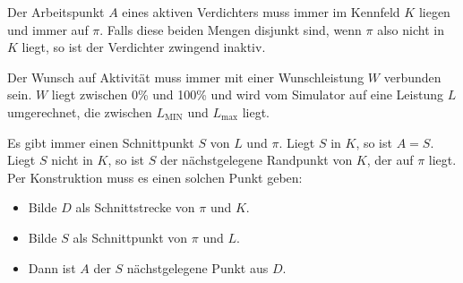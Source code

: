 \documentclass{article}
\newcommand{\Lmax}{L_\text{max}}
\begin{document}
Der Arbeitspunkt $A$ eines aktiven Verdichters muss immer im Kennfeld $K$
liegen und immer auf $\pi$. Falls diese beiden Mengen disjunkt sind, wenn $\pi$ also nicht in $K$ liegt, so ist der Verdichter zwingend inaktiv.

Der Wunsch auf Aktivität muss immer mit einer Wunschleistung $W$ verbunden
sein. $W$ liegt zwischen 0\% und 100\% und wird vom Simulator auf eine
Leistung $L$ umgerechnet, die zwischen $L_\text{MIN}$ und $\Lmax$ liegt.

Es gibt immer einen Schnittpunkt $S$ von $L$ und $\pi$. Liegt $S$ in $K$, so ist $A = S$. Liegt $S$ nicht in $K$, so ist $S$ der nächstgelegene Randpunkt von $K$, der auf
$\pi$ liegt. Per Konstruktion muss es einen solchen Punkt geben:

\begin{itemize}
\item Bilde $D$ als Schnittstrecke von $\pi$ und $K$.
\item Bilde $S$ als Schnittpunkt von $\pi$ und $L$.
\item Dann ist $A$ der $S$ nächstgelegene Punkt aus $D$.
\end{itemize}
\end{document}

